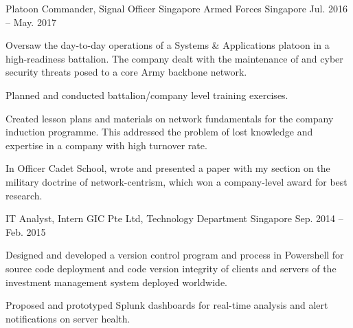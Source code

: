 \begin{cventries}
  \cventry
    {Platoon Commander, Signal Officer}
    {Singapore Armed Forces}
    {Singapore}
    {Jul. 2016 – May. 2017}
    {
      \begin{cvitems}
        \item {Oversaw the day-to-day operations of a Systems \& Applications platoon in a high-readiness battalion. The company dealt with the maintenance of and cyber security threats posed to a core Army backbone network.}
        \item {Planned and conducted battalion/company level training exercises.}
        \item {Created lesson plans and materials on network fundamentals for the company induction programme. This addressed the problem of lost knowledge and expertise in a company with high turnover rate.}
        \item {In Officer Cadet School, wrote and presented a paper with my section on the military doctrine of network-centrism, which won a company-level award for best research.}
      \end{cvitems}
    }
  \cventry
    {IT Analyst, Intern}
    {GIC Pte Ltd, Technology Department}
    {Singapore}
    {Sep. 2014 – Feb. 2015}
    {
      \begin{cvitems}
        \item {Designed and developed a version control program and process in Powershell for source code deployment and code version integrity of clients and servers of the investment management system deployed worldwide.}
        \item {Proposed and prototyped Splunk dashboards for real-time analysis and alert notifications on server health.}
      \end{cvitems} 
    }
\end{cventries}
